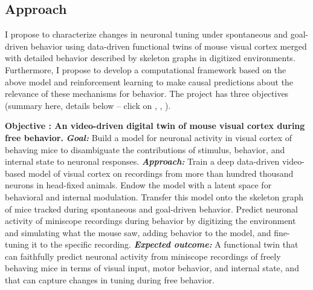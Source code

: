 \documentclass[COG,11pt]{ercgrant}
\begin{document}
\subsection{Approach}
I propose to characterize changes in neuronal tuning under spontaneous and goal-driven behavior using data-driven functional twins of mouse visual cortex merged with detailed behavior described by skeleton graphs in digitized environments.
Furthermore, I propose to develop a computational framework based on the above model and reinforcement learning to make causal predictions about the relevance of these mechanisms for behavior. The project has three objectives (summary here, details below -- click on , , ).

\newcommand{\itbf}[1]{\textit{\textbf{#1}}}
\textbf{Objective : An video-driven digital twin of mouse visual cortex during free behavior. } \itbf{Goal:} Build a model for neuronal activity in visual cortex of behaving mice to disambiguate the contributions of stimulus, behavior, and internal state to neuronal responses. \itbf{Approach:} Train a deep data-driven video-based model of visual cortex on recordings from more than hundred thousand neurons in head-fixed animals. Endow the model with a latent space for behavioral and internal modulation. Transfer this model onto the skeleton graph of mice tracked during spontaneous and goal-driven behavior. Predict neuronal activity of miniscope recordings during behavior by digitizing the environment and simulating what the mouse saw, adding behavior to the model,  and fine-tuning it to the specific recording. \itbf{Expected outcome:} A functional twin that can faithfully predict neuronal activity from miniscope recordings of freely behaving mice in terms of visual input, motor behavior, and internal state, and that can capture changes in tuning during free behavior. 
\end{document}
